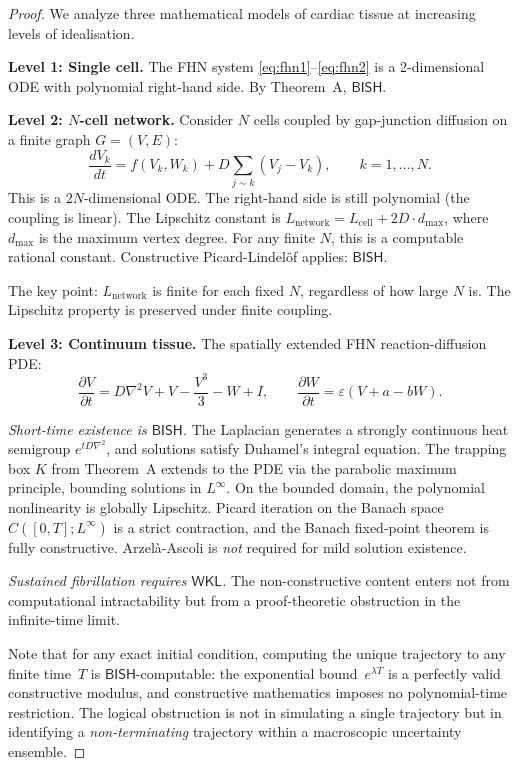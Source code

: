 \documentclass[11pt,a4paper]{article}
\theoremstyle{plain}
\theoremstyle{definition}
\newcommand{\BISH}{\textsf{BISH}}
\newcommand{\WKL}{\textsf{WKL}}
\begin{document}
\begin{proof}
We analyze three mathematical models of cardiac tissue at increasing levels of idealisation.

\textbf{Level 1: Single cell.}  The FHN system \eqref{eq:fhn1}--\eqref{eq:fhn2} is a 2-dimensional ODE with polynomial right-hand side.  By Theorem~A, $\BISH$.

\textbf{Level 2: $N$-cell network.}  Consider $N$ cells coupled by gap-junction diffusion on a finite graph $G = (V, E)$:
\[
  \frac{dV_k}{dt} = f(V_k, W_k) + D \sum_{j \sim k} (V_j - V_k), \qquad k = 1, \ldots, N.
\]
This is a $2N$-dimensional ODE.  The right-hand side is still polynomial (the coupling is linear).  The Lipschitz constant is $L_{\mathrm{network}} = L_{\mathrm{cell}} + 2D \cdot d_{\max}$, where $d_{\max}$ is the maximum vertex degree.  For any finite $N$, this is a computable rational constant.  Constructive Picard-Lindel\"of applies: $\BISH$.

The key point: $L_{\mathrm{network}}$ is finite for each fixed $N$, regardless of how large $N$ is.  The Lipschitz property is preserved under finite coupling.

\textbf{Level 3: Continuum tissue.}  The spatially extended FHN reaction-diffusion PDE:
\[
  \frac{\partial V}{\partial t} = D\nabla^2 V + V - \frac{V^3}{3} - W + I, \qquad
  \frac{\partial W}{\partial t} = \varepsilon(V + a - bW).
\]

\textit{Short-time existence is $\BISH$.}  The Laplacian generates a strongly continuous heat semigroup $e^{t D \nabla^2}$, and solutions satisfy Duhamel's integral equation.  The trapping box $K$ from Theorem~A extends to the PDE via the parabolic maximum principle, bounding solutions in $L^\infty$.  On the bounded domain, the polynomial nonlinearity is globally Lipschitz.  Picard iteration on the Banach space $C([0,T]; L^\infty)$ is a strict contraction, and the Banach fixed-point theorem is fully constructive.  Arzel\`a-Ascoli is \emph{not} required for mild solution existence.

\textit{Sustained fibrillation requires $\WKL$.}  The non-constructive content enters not from computational intractability but from a proof-theoretic obstruction in the infinite-time limit.

Note that for any exact initial condition, computing the unique trajectory to any finite time~$T$ is $\BISH$-computable: the exponential bound~$e^{\lambda T}$ is a perfectly valid constructive modulus, and constructive mathematics imposes no polynomial-time restriction.  The logical obstruction is not in simulating a single trajectory but in identifying a \emph{non-terminating} trajectory within a macroscopic uncertainty ensemble.


\end{proof}
\end{document}
